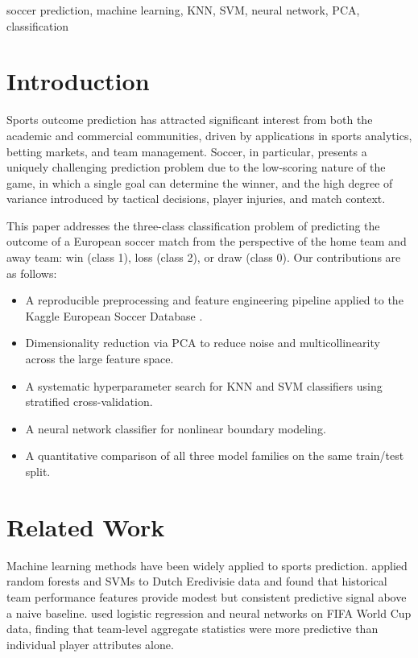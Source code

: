 \documentclass[conference]{IEEEtran}
\begin{document}
\begin{IEEEkeywords}
soccer prediction, machine learning, KNN, SVM, neural network, PCA, classification
\end{IEEEkeywords}

\section{Introduction}

Sports outcome prediction has attracted significant interest from both the academic and commercial communities, driven by applications in sports analytics, betting markets, and team management. Soccer, in particular, presents a uniquely challenging prediction problem due to the low-scoring nature of the game, in which a single goal can determine the winner, and the high degree of variance introduced by tactical decisions, player injuries, and match context.

This paper addresses the three-class classification problem of predicting the outcome of a European soccer match from the perspective of the home team and away team: win (class 1), loss (class 2), or draw (class 0). Our contributions are as follows:

\begin{itemize}
  \item A reproducible preprocessing and feature engineering pipeline applied to the Kaggle European Soccer Database \cite{kaggle_soccer}.
  \item Dimensionality reduction via PCA to reduce noise and multicollinearity across the large feature space.
  \item A systematic hyperparameter search for KNN and SVM classifiers using stratified cross-validation.
  \item A neural network classifier for nonlinear boundary modeling.
  \item A quantitative comparison of all three model families on the same train/test split.
\end{itemize}

\section{Related Work}

Machine learning methods have been widely applied to sports prediction. \cite{tax2015} applied random forests and SVMs to Dutch Eredivisie data and found that historical team performance features provide modest but consistent predictive signal above a naive baseline. \cite{ulmer2014} used logistic regression and neural networks on FIFA World Cup data, finding that team-level aggregate statistics were more predictive than individual player attributes alone.
\end{document}
